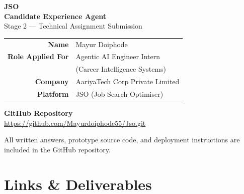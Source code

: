 \documentclass[11pt, a4paper]{article}
\begin{document}
\begin{titlepage}
\centering
\vspace*{3cm}

{\Huge\bfseries\color{jso} JSO}\\[6pt]
{\LARGE\bfseries\color{darkblue} Candidate Experience Agent}\\[20pt]
{\large Stage 2 — Technical Assignment Submission}

\vspace{2cm}

\begin{tabular}{r l}
\textbf{Name} & Mayur Doiphode \\
\textbf{Role Applied For} & Agentic AI Engineer Intern \\
 & (Career Intelligence Systems) \\
\textbf{Company} & AariyaTech Corp Private Limited \\
\textbf{Platform} & JSO (Job Search Optimiser) \\
\end{tabular}

\vspace{2cm}

\begin{tcolorbox}[colback=jso!5, colframe=jso, boxrule=1pt, arc=4pt, width=0.85\textwidth]
\centering
\textbf{GitHub Repository}\\[4pt]
\url{https://github.com/Mayurdoiphode55/Jso.git}

\vspace{10pt}

\end{tcolorbox}

\vfill
{\small\color{grey} All written answers, prototype source code, and deployment instructions are included in the GitHub repository.}
\end{titlepage}

\tableofcontents
\newpage

\section*{Links \& Deliverables}
\end{document}
